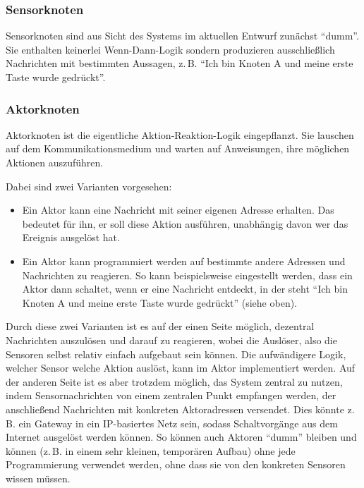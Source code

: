 \documentclass{IEEEtran}
\begin{document}
        \subsubsection{Sensorknoten}\label{Sensorknoten}
            Sensorknoten sind aus Sicht des Systems im aktuellen Entwurf
            zunächst \enquote{dumm}. Sie enthalten keinerlei Wenn-Dann-Logik
            sondern produzieren ausschließlich Nachrichten mit bestimmten
            Aussagen, z.\,B. \enquote{Ich bin Knoten A und meine erste Taste
            wurde gedrückt}.
        \subsubsection{Aktorknoten}\label{Aktorknoten}
            Aktorknoten ist die eigentliche Aktion-Reaktion-Logik eingepflanzt.
            Sie lauschen auf dem Kommunikationsmedium und warten auf Anweisungen,
            ihre möglichen Aktionen auszuführen.

            Dabei sind zwei Varianten vorgesehen:
            \begin{itemize}
                \item Ein Aktor kann eine Nachricht mit seiner eigenen Adresse
                    erhalten. Das bedeutet für ihn, er soll diese Aktion
                    ausführen, unabhängig davon wer das Ereignis ausgelöst hat.
                \item Ein Aktor kann programmiert werden auf bestimmte andere
                    Adressen und Nachrichten zu reagieren.
                    So kann beispielsweise eingestellt werden, dass ein Aktor
                    dann schaltet, wenn er eine Nachricht entdeckt, in der steht
                    \enquote{Ich bin Knoten A und meine erste Taste
                    wurde gedrückt} (siehe oben).
            \end{itemize}

            Durch diese zwei Varianten ist es auf der einen Seite möglich,
            dezentral Nachrichten auszulösen und darauf zu reagieren, wobei
            die Auslöser, also die Sensoren selbst relativ einfach aufgebaut
            sein können. Die aufwändigere Logik, welcher Sensor welche Aktion
            auslöst, kann im Aktor implementiert werden.
            Auf der anderen Seite ist es aber trotzdem möglich, das System
            zentral zu nutzen, indem Sensornachrichten von einem zentralen
            Punkt empfangen werden, der anschließend Nachrichten mit konkreten
            Aktoradressen versendet.
            Dies könnte z.\,B. ein Gateway in ein IP-basiertes Netz sein, sodass
            Schaltvorgänge aus dem Internet ausgelöst werden können.
            So können auch Aktoren \enquote{dumm}
            bleiben und können (z.\,B. in einem sehr kleinen, temporären Aufbau)
            ohne jede Programmierung verwendet werden, ohne dass sie von den
            konkreten Sensoren wissen müssen.
\end{document}
